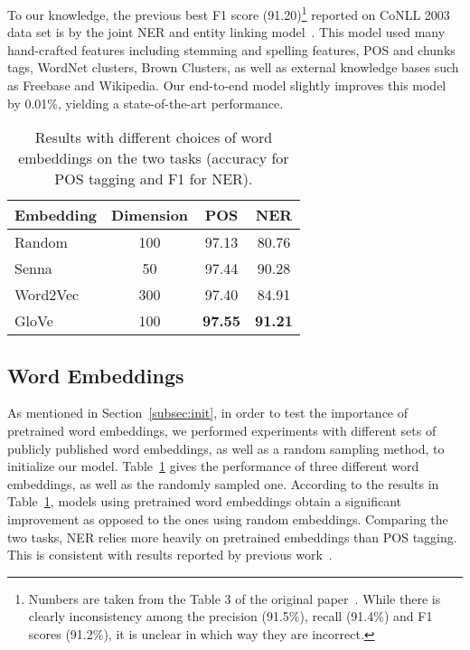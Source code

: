\documentclass[11pt]{article}
\begin{document}
To our knowledge, the previous best F1 score (91.20)\footnote{Numbers are taken from the Table 3 of the original paper~\cite{luo-EtAl:2015:EMNLP2}. While there is clearly inconsistency among the precision (91.5\%), recall (91.4\%) and F1 scores (91.2\%), it is unclear in which way they are incorrect.} reported on CoNLL 2003 data set is by the joint NER and entity linking model~\cite{luo-EtAl:2015:EMNLP2}. This model used many hand-crafted features including stemming and spelling features, POS and chunks tags, WordNet clusters, Brown Clusters, as well as external knowledge bases such as Freebase and Wikipedia. Our end-to-end model slightly improves this model by 0.01\%, yielding a state-of-the-art performance.

\begin{table}
\centering
\begin{tabular}[t]{l|c|c|c}
\hline
\textbf{Embedding} & Dimension & POS & NER \\
\hline
Random & 100 & 97.13 & 80.76 \\
Senna & 50 & 97.44 & 90.28 \\
Word2Vec & 300 & 97.40 & 84.91 \\
GloVe & 100 & \textbf{97.55} & \textbf{91.21} \\
\hline
\end{tabular}
\caption{Results with different choices of word embeddings on the two 
tasks (accuracy for POS tagging and F1 for NER).}
\label{tab:embedding}
\end{table}

\subsection{Word Embeddings}
\label{subsec:embedding}
As mentioned in Section~\ref{subsec:init}, in order to test the importance of pretrained word embeddings, we performed experiments with different sets of publicly published word embeddings, as well as a random sampling method, to initialize our model. Table~\ref{tab:embedding} gives the performance of three different word embeddings, as well as the randomly sampled one. According to the results in Table~\ref{tab:embedding}, models using pretrained word embeddings obtain a significant improvement as opposed to the ones using random embeddings. Comparing the two tasks, NER relies more heavily on pretrained embeddings than POS tagging. This is consistent with results reported by previous work~\cite{collobert2011natural,huang2015bidirectional,chiu2015named}.
\end{document}
